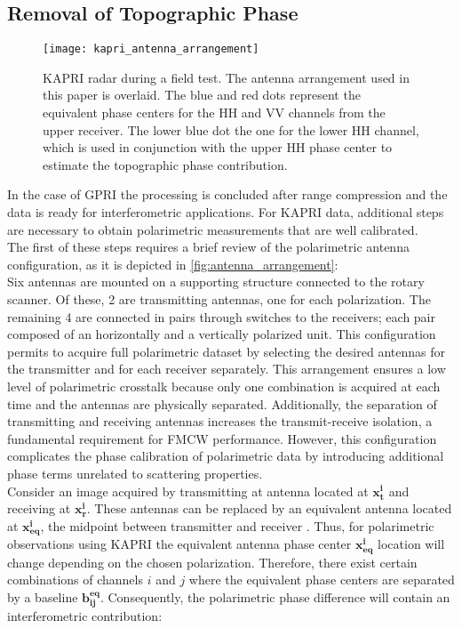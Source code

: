 \subsection{Removal of Topographic Phase}\label{sec:topo_removal}
\begin{figure}[ht]
	\centering
	\texttt{[image: kapri\_antenna\_arrangement]}
	\caption{KAPRI radar during a field test. The antenna arrangement used in this paper is overlaid. The blue and red dots represent the equivalent phase centers for the  HH and VV channels from the upper receiver. The lower blue dot the one for the lower HH channel, which is used in conjunction with the upper HH phase center to estimate the topographic phase contribution.}
	\label{fig:antenna_arrangement}
\end{figure}
In the case of GPRI the processing is concluded after range compression and the data is ready for interferometric applications.  For KAPRI data, additional steps are necessary to obtain polarimetric measurements that are well calibrated.\\ The first of these steps requires a brief review of the polarimetric antenna configuration, as it is depicted in \autoref{fig:antenna_arrangement}:\\ Six antennas are mounted on a supporting structure connected to the rotary scanner. Of these, 2 are transmitting antennas, one for each polarization. The remaining 4 are connected in pairs through switches to the receivers; each pair composed of an horizontally and a vertically polarized unit. This configuration permits to acquire full polarimetric dataset by selecting the desired antennas for the transmitter and for each receiver separately. This arrangement ensures a low level of polarimetric crosstalk because only one combination is acquired at each time and the antennas are physically separated. Additionally, the separation of transmitting and receiving antennas increases the transmit-receive isolation, a fundamental requirement for FMCW performance\cite{Beasley1990,Stove1992, Strozzi2011}.  However, this configuration complicates the phase calibration of polarimetric data by introducing additional phase terms unrelated to scattering properties.\\
Consider an image acquired by transmitting at antenna located at $\mathbf{x_t^i}$ and receiving at $\mathbf{x_r^i}$. These antennas can be replaced by an equivalent antenna located at $\mathbf{x_{eq}^i}$, the midpoint between transmitter and receiver \cite{Pipia2009}. Thus, for polarimetric observations using  KAPRI the equivalent antenna phase center $\mathbf{x_{eq}^i}$ location will change depending on the chosen polarization. Therefore, there exist certain combinations of channels $i$ and $j$ where the equivalent phase centers are separated by a baseline $\mathbf{b_{ij}^{eq}}$. Consequently, the polarimetric phase difference   will contain an interferometric contribution:

